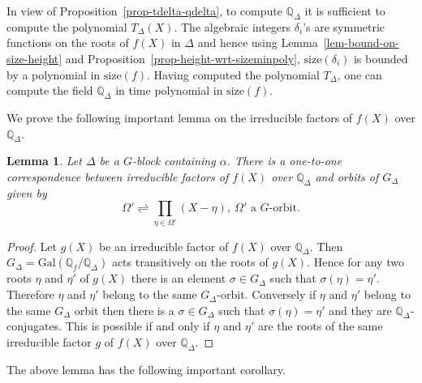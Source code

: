 \documentclass[11pt]{madras}%
\newtheorem{lemma}[theorem]{Lemma}
\theoremstyle{remark}
\newcommand{\Gal}[1]{{\ensuremath{\mathrm{Gal}\left(#1\right)}}}
\newcommand{\size}[1]{{\ensuremath{\mathrm{size}\left(#1\right)}}}
\begin{document}
In view of Proposition~\ref{prop-tdelta-qdelta}, to compute
$\mathbb{Q}_\Delta$ it is sufficient to compute the polynomial
$T_\Delta(X)$.  The algebraic integers $\delta_i$'s are symmetric
functions on the roots of $f(X)$ in $\Delta$ and hence using
Lemma~\ref{lem-bound-on-size-height} and
Proposition~\ref{prop-height-wrt-sizeminpoly}, $\size{\delta_i}$ is
bounded by a polynomial in $\size{f}$. Having computed the polynomial
$T_\Delta$, one can compute the field $\mathbb{Q}_\Delta$ in time
polynomial in $\size{f}$.

We prove the following important lemma on the irreducible factors of
$f(X)$ over $\mathbb{Q}_\Delta$.

\begin{lemma}\label{lem-orbit-corr}
  Let $\Delta$ be a $G$-block containing $\alpha$. There is a
  one-to-one correspondence between irreducible factors of $f(X)$ over
  $\mathbb{Q}_\Delta$ and orbits of $G_\Delta$ given by
  \[
  \Omega' \rightleftharpoons \prod_{\eta \in \Omega'} (X - \eta),\
  \Omega' \textrm{ a }G\textrm{-orbit}.
  \]
\end{lemma}
\begin{proof}
  Let $g(X)$ be an irreducible factor of $f(X)$ over
  $\mathbb{Q}_\Delta$.  Then $G_\Delta =
  \Gal{\mathbb{Q}_f/\mathbb{Q}_\Delta}$ acts transitively on the roots
  of $g(X)$. Hence for any two roots $\eta$ and $\eta'$ of $g(X)$
  there is an element $\sigma \in G_\Delta$ such that $\sigma(\eta) =
  \eta'$. Therefore $\eta$ and $\eta'$ belong to the same
  $G_\Delta$-orbit. Conversely if $\eta$ and $\eta'$ belong to the
  same $G_\Delta$ orbit then there is a $\sigma \in G_\Delta$ such
  that $\sigma(\eta) = \eta'$ and they are
  $\mathbb{Q}_\Delta$-conjugates.  This is possible if and only if
  $\eta$ and $\eta'$ are the roots of the same irreducible factor $g$
  of $f(X)$ over $\mathbb{Q}_\Delta$.
\end{proof}

The above lemma has the following important corollary.
\end{document}
